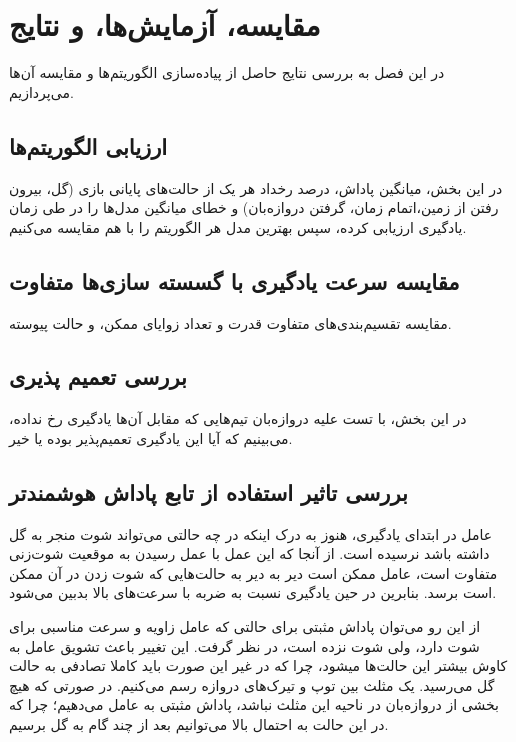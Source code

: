 \chapter{مقایسه، آزمایش‌ها، و نتایج}
در این فصل به بررسی نتایج حاصل از پیاده‌سازی الگوریتم‌ها و مقایسه آن‌ها می‌پردازیم.
\section{ارزیابی الگوریتم‌ها}
در این بخش، میانگین پاداش، درصد رخداد هر یک از حالت‌های پایانی بازی (گل، بیرون رفتن از زمین،اتمام زمان، گرفتن دروازه‌بان)
و خطای میانگین مدل‌ها را در طی زمان یادگیری ارزیابی کرده،
سپس بهترین مدل هر الگوریتم‌ را با هم مقایسه می‌کنیم.
\section{مقایسه سرعت یادگیری با گسسته سازی‌ها متفاوت}
مقایسه تقسیم‌بندی‌های متفاوت قدرت و تعداد زوایای ممکن، و حالت پیوسته.
\section{بررسی تعمیم پذیری}
در این بخش، با تست علیه دروازه‌بان تیم‌هایی که مقابل آن‌ها یادگیری رخ نداده، می‌بینیم که آیا این یادگیری تعمیم‌پذیر بوده یا خیر.
\section{بررسی تاثیر استفاده از تابع پاداش هوشمند‌تر}
عامل در ابتدای یادگیری، هنوز به درک اینکه در چه حالتی می‌تواند شوت منجر به گل داشته باشد نرسیده است.
از آنجا که این عمل با عمل رسیدن به موقعیت شوت‌زنی متفاوت است، عامل ممکن است دیر به دیر به حالت‌هایی که شوت زدن در آن ممکن است برسد.
بنابرین در حین یادگیری نسبت به ضربه با سرعت‌های بالا بدبین می‌شود.

از این رو می‌توان پاداش مثبتی برای حالتی که عامل زاویه و سرعت مناسبی برای شوت دارد، ولی شوت نزده است، در نظر گرفت.
این تغییر باعث تشویق عامل به کاوش بیشتر این حالت‌ها میشود، چرا که در غیر این صورت باید کاملا تصادفی به حالت گل می‌رسید.
یک مثلث بین توپ و تیرک‌های دروازه رسم می‌کنیم. در صورتی که هیچ بخشی از دروازه‌بان در ناحیه این مثلث نباشد، پاداش مثبتی به عامل می‌دهیم؛ چرا که در این حالت به احتمال بالا می‌توانیم بعد از چند گام به گل برسیم.

